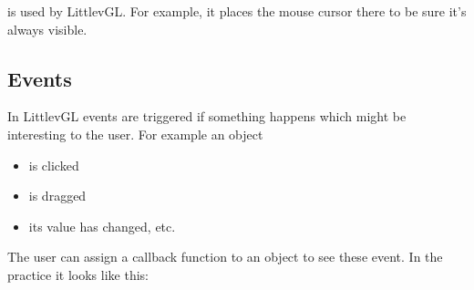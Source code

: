 \documentclass[letterpaper,10pt,english]{sphinxmanual}
\begin{document}
 is used by LittlevGL. For example, it places the mouse cursor there to be sure it’s always visible.


\subsection{Events}
\label{\detokenize{overview/events:events}}\label{\detokenize{overview/events::doc}}
In LittlevGL events are triggered if something happens which might be interesting to the user. For example an object
\begin{itemize}
\item {} 
is clicked

\item {} 
is dragged

\item {} 
its value has changed, etc.

\end{itemize}

The user can assign a callback function to an object to see these event. In the practice it looks like this:
\end{document}
